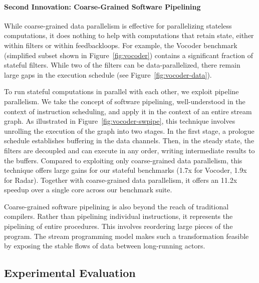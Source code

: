 \paragraph*{Second Innovation: Coarse-Grained Software Pipelining} While 
coarse-grained data parallelism is effective for parallelizing
stateless computations, it does nothing to help with computations that
retain state, either within filters or within feedbackloops.  For
example, the Vocoder benchmark (simplified subset shown in
Figure~\ref{fig:vocoder}) contains a significant fraction of stateful
filters.  While two of the filters can be data-parallelized, there
remain large gaps in the execution schedule (see
Figure~\ref{fig:vocoder-data}).

To run stateful computations in parallel with each other, we exploit
pipeline parallelism.  We take the concept of software pipelining,
well-understood in the context of instruction scheduling, and apply it
in the context of an entire stream graph.  As illustrated in
Figure~\ref{fig:vocoder-swpipe}, this technique involves unrolling the
execution of the graph into two stages.  In the first stage, a
prologue schedule establishes buffering in the data channels.  Then,
in the steady state, the filters are decoupled and can execute in any
order, writing intermediate results to the buffers.  Compared to
exploiting only coarse-grained data parallelism, this technique offers
large gains for our stateful benchmarks (1.7x for Vocoder, 1.9x for
Radar).  Together with coarse-grained data parallelism, it offers an
11.2x speedup over a single core across our benchmark suite.

Coarse-grained software pipelining is also beyond the reach of
traditional compilers.  Rather than pipelining individual
instructions, it represents the pipelining of entire procedures.  This
involves reordering large pieces of the program.  The stream
programming model makes such a transformation feasible by exposing the
stable flows of data between long-running actors.

\subsection*{Experimental Evaluation}


